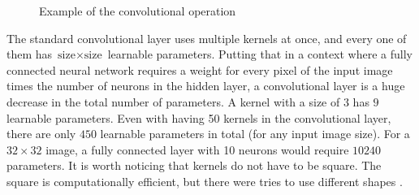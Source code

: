 \begin{figure}[ht]
    \caption{Example of the convolutional operation}
    \label{fig:convolutional operation}
\end{figure}

The standard convolutional layer uses multiple kernels at once, and every one of them has $\text{size} \times \text{size}$ learnable parameters. Putting that in a context where a fully connected neural network requires a weight for every pixel of the input image times the number of neurons in the hidden layer, a convolutional layer is a huge decrease in the total number of parameters. A kernel with a size of $3$ has $9$ learnable parameters. Even with having 50 kernels in the convolutional layer, there are only $450$ learnable parameters in total (for any input image size). For a $32\times32$ image, a fully connected layer with 10 neurons would require $10240$ parameters. It is worth noticing that kernels do not have to be square. The square is computationally efficient, but there were tries to use different shapes \cite{luo2019hexagonal, graham2015sparse, thomas2019kpconv}.

